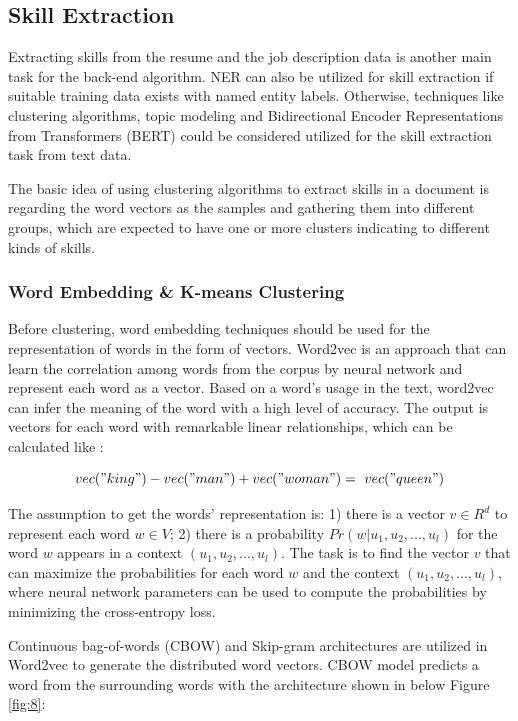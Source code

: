 \subsection{Skill Extraction}

Extracting skills from the resume and the job description data is another main task for the back-end algorithm. NER can also be utilized for skill extraction if suitable training data exists with named entity labels. Otherwise, techniques like clustering algorithms, topic modeling and Bidirectional Encoder Representations from Transformers (BERT) could be considered utilized for the skill extraction task from text data.


The basic idea of using clustering algorithms to extract skills in a document is regarding the word vectors as the samples and gathering them into different groups, which are expected to have one or more clusters indicating to different kinds of skills. 

\subsubsection{Word Embedding \& K-means Clustering}
\label{sec:word2vec}

Before clustering, word embedding techniques should be used for the representation of words in the form of vectors. Word2vec is an approach that can learn the correlation among words from the corpus by neural network and represent each word as a vector. Based on a word's usage in the text, word2vec can infer the meaning of the word with a high level of accuracy. The output is vectors for each word with remarkable linear relationships, which can be calculated like \cite{mikolov2013efficient}:

\begin{equation}
    vec("king") - vec("man") + vec("woman") =~ vec("queen")
\end{equation}

The assumption to get the words' representation is: 1) there is a vector $v \in R^d$ to represent each word $w \in V$; 2) there is a probability $Pr(w|u_1,u_2,...,u_l)$ for the word $w$ appears in a context $(u_1,u_2,...,u_l)$. The task is to find the vector $v$ that can maximize the probabilities for each word $w$ and the context $(u_1, u_2,...,u_l)$, where neural network parameters can be used to compute the probabilities by minimizing the cross-entropy loss.

Continuous bag-of-words (CBOW) and Skip-gram architectures are utilized in Word2vec to generate the distributed word vectors. CBOW model predicts a word from the surrounding words with the architecture shown in below Figure \ref{fig:8}:

